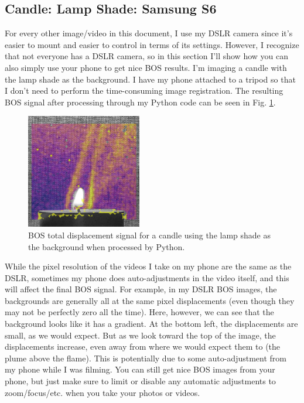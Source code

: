 \documentclass[letterpaper,12pt]{article}
\begin{document}
\subsection{Candle: Lamp Shade: Samsung S6}
\label{subsec:Candle_Lamp_Shade_Samsung_S6}

For every other image/video in this document, I use my DSLR camera since it's easier to mount and easier to control in terms of its settings.  However, I recognize that not everyone has a DSLR camera, so in this section I'll show how you can also simply use your phone to get nice BOS results.  I'm imaging a candle with the lamp shade as the background.  I have my phone attached to a tripod so that I don't need to perform the time-consuming image registration.  The resulting BOS signal after processing through my Python code can be seen in Fig. \ref{fig:Candle_Light_Shade_Samsung_0p08_1p25}.

\begin{figure}[h]
    \centering
	\includegraphics[height=5cm]{Candle_Light_Shade_Samsung_0p08_1p25.PNG}
    \caption{BOS total displacement signal for a candle using the lamp shade as the background when processed by Python.}
    \label{fig:Candle_Light_Shade_Samsung_0p08_1p25}
\end{figure}

While the pixel resolution of the videos I take on my phone are the same as the DSLR, sometimes my phone does auto-adjustments in the video itself, and this will affect the final BOS signal.  For example, in my DSLR BOS images, the backgrounds are generally all at the same pixel displacements (even though they may not be perfectly zero all the time).  Here, however, we can see that the background looks like it has a gradient.  At the bottom left, the displacements are small, as we would expect.  But as we look toward the top of the image, the displacements increase, even away from where we would expect them to (the plume above the flame).  This is potentially due to some auto-adjustment from my phone while I was filming.  You can still get nice BOS images from your phone, but just make sure to limit or disable any automatic adjustments to zoom/focus/etc. when you take your photos or videos.
\end{document}
